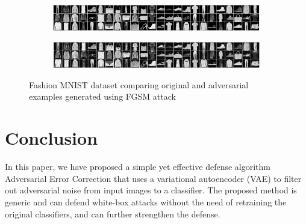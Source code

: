 \documentclass[journal]{IEEEtran}
\begin{document}
\begin{figure}[t]
	\centering

	\begin{subfigure}{\textwidth}
		\centering
		\includegraphics[width=\textwidth]{Images/MNIST/FGSM/Original.png}
	\end{subfigure}
	\begin{subfigure}{\textwidth}
		\centering
		\includegraphics[width=\textwidth]{Images/MNIST/FGSM/FGSM.png}
	\end{subfigure}

	\caption{Fashion MNIST dataset comparing original and adversarial examples generated using FGSM\cite{FGSM} attack}
	
	\label{fig: FMNIST_FGSM}
\end{figure}

\section{Conclusion}
In this paper, we have proposed a simple yet effective defense algorithm Adversarial Error Correction that uses a variational autoencoder (VAE) to filter out adversarial noise from input images to a classifier. The proposed method is generic and can defend white-box attacks without the need of retraining the original classifiers, and can further strengthen the defense.



\end{document}
